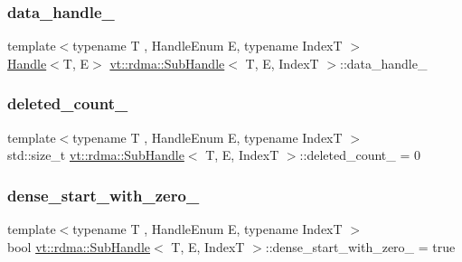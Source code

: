 \subsubsection{\texorpdfstring{data\+\_\+handle\+\_\+}{data\_handle\_}}
{\footnotesize\ttfamily template$<$typename T , Handle\+Enum E, typename IndexT $>$ \\
\hyperlink{structvt_1_1rdma_1_1_handle}{Handle}$<$T, E$>$ \hyperlink{structvt_1_1rdma_1_1_sub_handle}{vt\+::rdma\+::\+Sub\+Handle}$<$ T, E, IndexT $>$\+::data\+\_\+handle\+\_\+\hspace{0.3cm}{\ttfamily [protected]}}

\mbox{\label{structvt_1_1rdma_1_1_sub_handle_af2147cd68e8f323bad1e63c83f529bfe}} 
\subsubsection{\texorpdfstring{deleted\+\_\+count\+\_\+}{deleted\_count\_}}
{\footnotesize\ttfamily template$<$typename T , Handle\+Enum E, typename IndexT $>$ \\
std\+::size\+\_\+t \hyperlink{structvt_1_1rdma_1_1_sub_handle}{vt\+::rdma\+::\+Sub\+Handle}$<$ T, E, IndexT $>$\+::deleted\+\_\+count\+\_\+ = 0\hspace{0.3cm}{\ttfamily [protected]}}

\mbox{\label{structvt_1_1rdma_1_1_sub_handle_a21a1dd0a0dda531cb1153d58c5bad18b}} 
\subsubsection{\texorpdfstring{dense\+\_\+start\+\_\+with\+\_\+zero\+\_\+}{dense\_start\_with\_zero\_}}
{\footnotesize\ttfamily template$<$typename T , Handle\+Enum E, typename IndexT $>$ \\
bool \hyperlink{structvt_1_1rdma_1_1_sub_handle}{vt\+::rdma\+::\+Sub\+Handle}$<$ T, E, IndexT $>$\+::dense\+\_\+start\+\_\+with\+\_\+zero\+\_\+ = true\hspace{0.3cm}{\ttfamily [protected]}}

